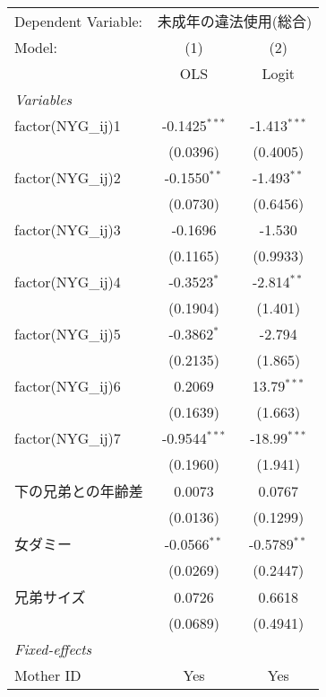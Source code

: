 \documentclass{article}
\begin{document}
\begingroup
\centering
\begin{tabular}{lcc}
   \tabularnewline \midrule \midrule
   Dependent Variable: & \multicolumn{2}{c}{未成年の違法使用(総合)}\\
   Model:              & (1)             & (2)\\  
                       &  OLS            & Logit\\  
   \midrule
   \emph{Variables}\\
   factor(NYG\_ij)1    & -0.1425$^{***}$ & -1.413$^{***}$\\   
                       & (0.0396)        & (0.4005)\\   
   factor(NYG\_ij)2    & -0.1550$^{**}$  & -1.493$^{**}$\\   
                       & (0.0730)        & (0.6456)\\   
   factor(NYG\_ij)3    & -0.1696         & -1.530\\   
                       & (0.1165)        & (0.9933)\\   
   factor(NYG\_ij)4    & -0.3523$^{*}$   & -2.814$^{**}$\\   
                       & (0.1904)        & (1.401)\\   
   factor(NYG\_ij)5    & -0.3862$^{*}$   & -2.794\\   
                       & (0.2135)        & (1.865)\\   
   factor(NYG\_ij)6    & 0.2069          & 13.79$^{***}$\\   
                       & (0.1639)        & (1.663)\\   
   factor(NYG\_ij)7    & -0.9544$^{***}$ & -18.99$^{***}$\\   
                       & (0.1960)        & (1.941)\\   
   下の兄弟との年齢差  & 0.0073          & 0.0767\\   
                       & (0.0136)        & (0.1299)\\   
   女ダミー            & -0.0566$^{**}$  & -0.5789$^{**}$\\   
                       & (0.0269)        & (0.2447)\\   
   兄弟サイズ          & 0.0726          & 0.6618\\   
                       & (0.0689)        & (0.4941)\\   
   \midrule
   \emph{Fixed-effects}\\
   Mother ID           & Yes             & Yes\\  

\end{tabular}
\end{document}
